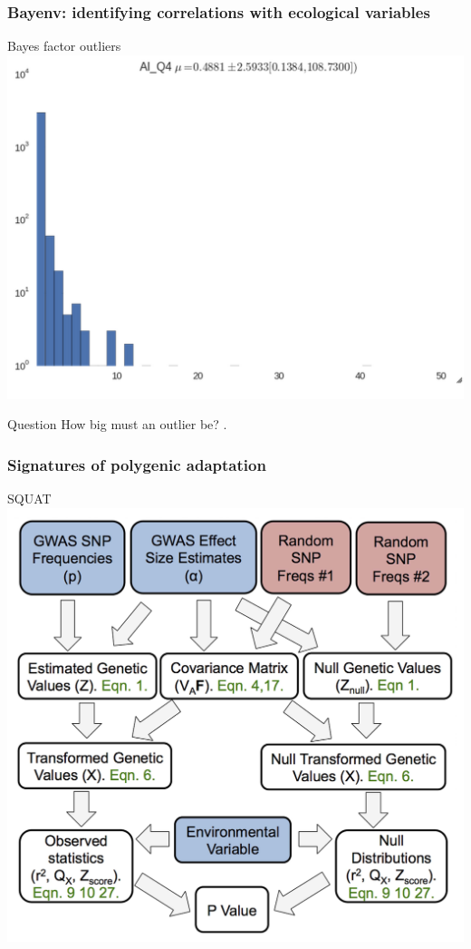 \begin{frame}
\frametitle{Bayenv: identifying correlations with ecological
variables}
\begin{block}{Bayes factor outliers}
\centering
\includegraphics[height=0.6\textheight]{bayenv_outlier.png}
\end{block}
\begin{block}{Question}
How big must an outlier be? \citep{Kass:1995vb}.
\end{block}
\end{frame}



\begin{frame}
\frametitle{Signatures of polygenic adaptation}
\begin{block}{SQUAT}
\centering
\includegraphics[height=.8\textheight]{bc1.png}
\end{block}
\tiny
\citet[Figure 1]{Berg:2014bs}
\end{frame}

